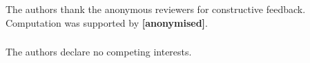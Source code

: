 \documentclass[runningheads]{llncs}
\begin{document}
\begin{credits}
\subsubsection{\ackname} The authors thank the anonymous reviewers
for constructive feedback. Computation was supported by
\textbf{[anonymised]}.

\subsubsection{\discintname} The authors declare no competing
interests.
\end{credits}



\end{document}
